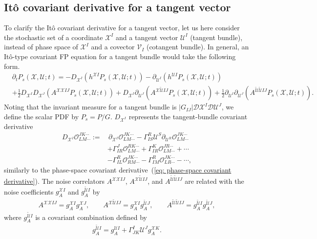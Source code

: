 \documentclass[aps, prd
, preprint
, nofootinbib 
, longbibliography
]{revtex4-1}
\newcommand{\scrD}{\mathscr{D}}
\newcommand{\calO}{\mathcal{O}}
\newcommand{\calU}{\mathcal{U}}
\newcommand{\calV}{\mathcal{V}}
\newcommand{\calX}{\mathcal{X}}
\newcommand{\bae}[1]{\begin{align} #1 \end{align}}
\begin{document}
\subsection{It\^o covariant derivative for a tangent vector}

To clarify the It\^o covariant derivative for a tangent vector,
let us here consider the stochastic set of a coordinate $\calX^I$ and a tangent vector $\calU^I$ (tangent bundle), instead of phase space of $\calX^I$ and a covector $\calV_I$ (cotangent bundle).
In general, an It\^o-type covariant FP equation for a tangent bundle would take the following form.
\bae{
    &\partial_tP_s(\calX,\calU;t)=-D_{\calX^I}(h^{\calX I}P_s(\calX,\calU;t))-\partial_{\calU^I}(h^{\calU I}P_s(\calX,\calU;t)) \nonumber \\
    &+\frac{1}{2}D_{\calX^I}D_{\calX^J}(A^{\calX\calX IJ}P_s(\calX,\calU;t))+D_{\calX^I}\partial_{\calU^J}(A^{\calX\tilde{\calU}IJ}P_s(\calX,\calU;t))+\frac{1}{2}\partial_{\calU^I}\partial_{\calU^J}(A^{\tilde{\calU}\tilde{\calU}IJ}P_s(\calX,\calU;t)).
}
Noting that the invariant measure for a tangent bundle is $|G_{IJ}|\scrD\calX^I\scrD\calU^J$, we define the scalar PDF by $P_s=P/G$.
$D_{\calX^I}$ represents the tangent-bundle covariant derivative
\bae{
    D_{\calX^I}\calO^{JK\cdots}_{LM\cdots}:=&\,\partial_{\calX^I}\calO^{JK\cdots}_{LM\cdots}-\Gamma_{IS}^R\calU^S\partial_{\calU^R}\calO^{JK\cdots}_{LM\cdots} \nonumber \\
    &+\Gamma^J_{IR}\calO^{RK\cdots}_{LM\cdots}+\Gamma^K_{IR}\calO^{JR\cdots}_{LM\cdots}+\cdots \nonumber \\
    &-\Gamma_{IL}^R\calO^{JK\cdots}_{RM\cdots}-\Gamma_{IM}^R\calO^{JK\cdots}_{LR\cdots}-\cdots,
}
similarly to the phase-space covariant derivative~(\ref{eq: phase-space covariant derivative}).
The noise correlators $A^{\calX\calX IJ}$, $A^{\calX\tilde{\calU} IJ}$, and $A^{\tilde{\calU}\tilde{\calU}IJ}$ are related with the noise coefficients $g^{\calX I}_A$ and $g^{\tilde{\calU}I}_A$ by
\bae{
    A^{\calX\calX IJ}=g^{\calX I}_Ag^{\calX J}_A, \qquad A^{\calX\tilde{\calU}IJ}=g^{\calX I}_Ag^{\tilde{\calU}J}_A, \qquad A^{\tilde{\calU}\tilde{\calU}IJ}=g^{\tilde{\calU}I}_Ag^{\tilde{\calU}J}_A,
}
where $g^{\tilde{\calU}I}_A$ is a covariant combination defined by
\bae{
    g^{\tilde{\calU}I}_A=g^{\calU I}_A+\Gamma^I_{JK}\calU^Jg^{\calX K}_A.
}
\end{document}
